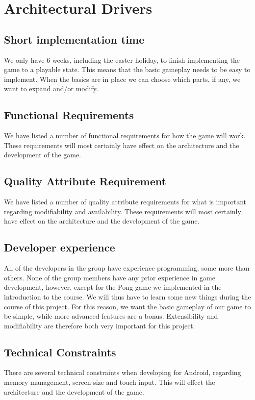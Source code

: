 \section{Architectural Drivers}
\label{sec:architecturaldrivers}

\subsection{Short implementation time}
We only have 6 weeks, including the easter holiday, to finish implementing the
game to a playable state. This means that the basic gameplay needs to be easy
to implement. When the basics are in place we can choose which parts, if any,
we want to expand and/or modify.

\subsection{Functional Requirements}
We have listed a number of functional requirements for how the game will work. These requirements will most certainly have effect on the architecture and the development of the game.

\subsection{Quality Attribute Requirement}
We have listed a number of quality attribute requirements for what is important regarding modifiability and availability. These requirements will most certainly have effect on the architecture and the development of the game. 

\subsection{Developer experience}
All of the developers in the group have experience programming; some more than
others. None of the group members have any prior experience in game
development, however, except for the Pong game we implemented in the
introduction to the course. We will thus have to learn some new things during
the course of this project. For this reason, we want the basic gameplay of our
game to be simple, while more advanced features are a bonus. Extensibility and
modifiability are therefore both very important for this project.


\subsection{Technical Constraints}
There are several technical constraints when developing for Android, regarding memory management, screen size and touch input. This will effect the architecture and the development of the game.


